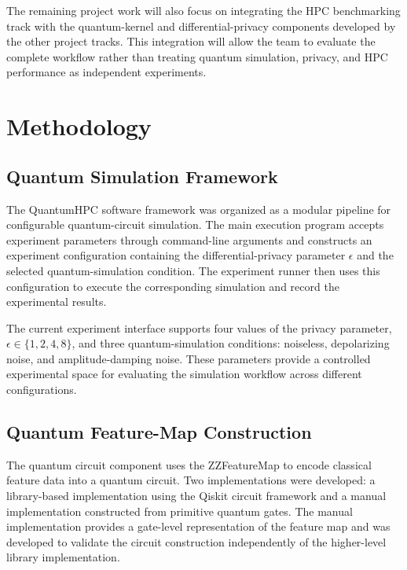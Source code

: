 \documentclass[pdflatex,sn-mathphys-num]{sn-jnl}%
\theoremstyle{thmstyleone}%
\theoremstyle{thmstyletwo}%
\theoremstyle{thmstylethree}%
\begin{document}
The remaining project work will also focus on integrating the HPC benchmarking track with the quantum-kernel and differential-privacy components developed by the other project tracks. This integration will allow the team to evaluate the complete workflow rather than treating quantum simulation, privacy, and HPC performance as independent experiments.

\section{Methodology}\label{sec:methodology}

\subsection{Quantum Simulation Framework}\label{subsec:quantum-framework}

The QuantumHPC software framework was organized as a modular pipeline for configurable quantum-circuit simulation. The main execution program accepts experiment parameters through command-line arguments and constructs an experiment configuration containing the differential-privacy parameter $\epsilon$ and the selected quantum-simulation condition. The experiment runner then uses this configuration to execute the corresponding simulation and record the experimental results.

The current experiment interface supports four values of the privacy parameter, $\epsilon \in \{1,2,4,8\}$, and three quantum-simulation conditions: noiseless, depolarizing noise, and amplitude-damping noise. These parameters provide a controlled experimental space for evaluating the simulation workflow across different configurations.

\subsection{Quantum Feature-Map Construction}\label{subsec:feature-map}

The quantum circuit component uses the ZZFeatureMap to encode classical feature data into a quantum circuit. Two implementations were developed: a library-based implementation using the Qiskit circuit framework and a manual implementation constructed from primitive quantum gates. The manual implementation provides a gate-level representation of the feature map and was developed to validate the circuit construction independently of the higher-level library implementation.
\end{document}
